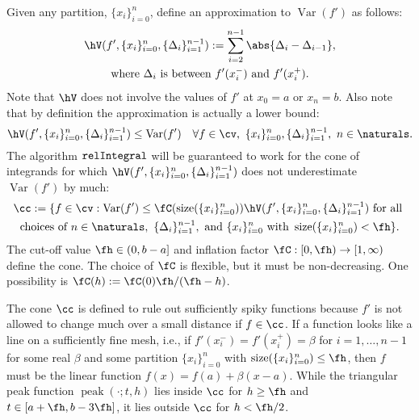 \documentclass{iitthesis}
\DeclareMathOperator{\relinteg}{\texttt{\textup{relIntegral}}}
\DeclareMathOperator{\Var}{Var}
\DeclareMathOperator{\size}{size}
\DeclareMathOperator{\tri}{peak}
\newcommand{\datasites}{\{x_i\}_{i=0}^n}
\newcommand{\hcut}{\fh}
\begin{document}
Given any partition, $\datasites$, define an approximation to $\Var(f')$ as follows:
\begin{multline} \label{tVdef}
\hV(f',\datasites,\{\Delta_{i}\}_{i=1}^{n-1}) : = \sum_{i=2}^{n-1} \abs{\Delta_{i} - \Delta_{i-1}}, \\
\text{where } \Delta_{i} \text{ is between } f'(x_i^-) \text{ and } f'(x_i^+).
\end{multline}
Note that $\hV$ does not involve the values of $f'$ at $x_0=a$ or $x_n=b$.  Also note that by definition the approximation is actually a lower bound:
\begin{equation} \label{hVlowerbd}
\hV(f',\datasites,\{\Delta_{i}\}_{i=1}^{n-1}) \le \Var(f') \quad \forall f \in \cv, \ \datasites, \{\Delta_{i}\}_{i=1}^{n-1}, \ n \in \naturals.
\end{equation}
The algorithm $\relinteg$ will be guaranteed to work for the cone of integrands for which $\hV(f',\datasites,\{\Delta_{i}\}_{i=1}^{n-1})$ does not underestimate $\Var(f')$ by  much:
\begin{multline} \label{conedef}
\cc := \{ f \in \cv : \Var(f') \le \fC(\size(\datasites)) \hV(f',\datasites,\{\Delta_{i}\}_{i=1}^{n-1}) \text{ for all } \\
\text{choices of }  n \in \naturals, \ \{\Delta_{i}\}_{i=1}^{n-1}, \text{ and }\datasites \text{ with } \size(\datasites) < \hcut \}.
\end{multline}
The cut-off value $\hcut \in (0, b-a]$ and inflation factor $\fC:[0,\hcut) \to [1,\infty)$ define the cone.  The choice of $\fC$ is flexible, but it must be non-decreasing.  One possibility is $\fC(h):=\fC(0) \hcut/(\hcut-h)$.

The cone $\cc$ is defined to rule out sufficiently spiky functions because $f'$ is not allowed to change much over a small distance if $f \in \cc$.  If a function looks like a line on a sufficiently fine mesh, i.e., if $f'(x_i^-)=f'(x_i^+)=\beta$ for $i=1, \ldots, n-1$ for some real $\beta$ and some partition $\datasites$ with $\size(\datasites) \le \hcut$, then $f$ must be the linear function $f(x)= f(a) + \beta(x-a)$.  While the triangular peak function $\tri(\cdot;t,h)$ lies inside $\cc$ for $h \ge \hcut$ and $t \in [a+\hcut,b-3\hcut]$, it lies outside $\cc$ for $h < \hcut/2$.
\end{document}
